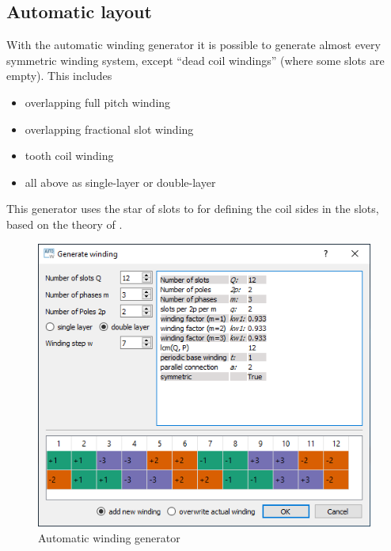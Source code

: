 \documentclass[]{scrreprt}
\begin{document}
\subsection{Automatic layout}
With the automatic winding generator it is possible to generate almost every symmetric winding system, 
except "`dead coil windings"' (where some slots are empty). 
This includes
\begin{itemize}
 \item overlapping full pitch winding
 \item overlapping fractional slot winding
 \item tooth coil winding
 \item all above as single-layer or double-layer
\end{itemize}
%
This generator uses the star of slots to for defining
the coil sides in the slots, based on the theory of \cite{1629527}.
%
\begin{figure}[htpb]
    \centering
    \includegraphics[width=0.99\textwidth,angle=0]{fig/auto_winding}
    \caption{Automatic winding generator }
    \label{fig:auto_winding}
\end{figure}
%
%
\end{document}
